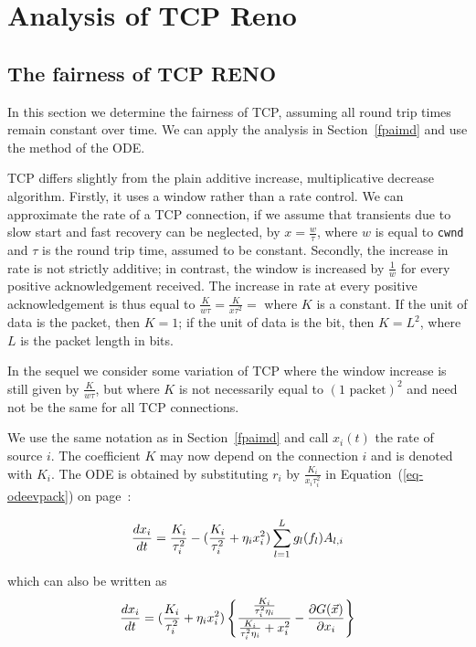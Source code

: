 \section{Analysis of TCP Reno}

\subsection{The fairness of TCP RENO}
In this section we determine the fairness of TCP, assuming all
round trip times remain constant over time. We can apply the analysis in
Section~\ref{fpaimd} and use the method of the ODE.

TCP differs slightly from the plain additive increase,
multiplicative decrease algorithm. Firstly, it uses a window
rather than a rate control. We can approximate the rate of a TCP
connection, if we assume that transients due to slow start and
fast recovery can be neglected, by $x= \frac{w}{\tau}$, where
$w$ is equal to \texttt{cwnd} and $\tau$ is the round trip time,
assumed to be constant. Secondly, the increase in rate is not
strictly additive; in contrast, the window is increased by
$\frac{1}{w}$ for every positive acknowledgement received. The
increase in rate at every positive acknowledgement is thus equal
to $\frac{K}{w \tau}=\frac{K}{x \tau^2}=$ where $K$ is a constant.
If the unit of data is the packet, then $K=1$; if the unit of data
is the bit, then $K=L^2$, where $L$ is the packet length in bits.

In the sequel we consider some variation of TCP where the window
increase is still given by $\frac{K}{w \tau}$, but where $K$ is
not necessarily equal to $(1 \mbox{ packet})^2$ and need not be the same for all TCP connections.

We use the same notation as in Section~\ref{fpaimd} and call
$x_i(t)$ the rate of source $i$. The coefficient $K$ may now
depend on the connection $i$ and is denoted with $K_i$. The ODE is obtained by substituting $r_i$
by $\frac{K_i}{x_i \tau_i^2}$ in Equation~(\ref{eq-odeevpack}) on
page~\pageref{eq-odeevpack}:

\begin{equation}\mylabel{eq-odetcp}
\frac{dx_{i}}{dt}
        =
        \frac{K_i}{ \tau_i^2}  -  ( \frac{K_i}{ \tau_i^2}+\eta_i x_{i}^2) \sum_{l=1}^{L}
        g_{l}(f_{l})A_{l,i}
\end{equation}

which can also be written as
\begin{equation}
\mylabel{eq-odetcp-2}
\frac{dx_{i}}{dt}
        =
 ( \frac{K_i}{ \tau_i^2}+\eta_i x_{i}^2)
       \left\{
         \frac
            { \frac{K_i}{ \tau_i^2 \eta_i}}
            {\frac{K_i}{ \tau_i^2 \eta_i} + x_i^2}  -
           \frac{\partial G (\vec{x})}{\partial x_{i}}
        \right\}
\end{equation}


